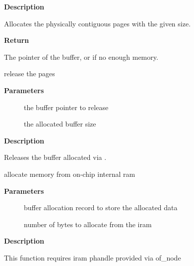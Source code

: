 \documentclass[a4paper,8pt,english]{sphinxmanual}
\begin{document}
\textbf{Description}

Allocates the physically contiguous pages with the given size.

\textbf{Return}

The pointer of the buffer, or  if no enough memory.

\begin{fulllineitems}
\label{sound/kernel-api/alsa-driver-api:c.snd_free_pages}
release the pages

\end{fulllineitems}


\textbf{Parameters}
\begin{description}
\item[{}] \leavevmode
the buffer pointer to release

\item[{}] \leavevmode
the allocated buffer size

\end{description}

\textbf{Description}

Releases the buffer allocated via .

\begin{fulllineitems}
\label{sound/kernel-api/alsa-driver-api:c.snd_malloc_dev_iram}
allocate memory from on-chip internal ram

\end{fulllineitems}


\textbf{Parameters}
\begin{description}
\item[{}] \leavevmode
buffer allocation record to store the allocated data

\item[{}] \leavevmode
number of bytes to allocate from the iram

\end{description}

\textbf{Description}

This function requires iram phandle provided via of\_node
\end{document}
